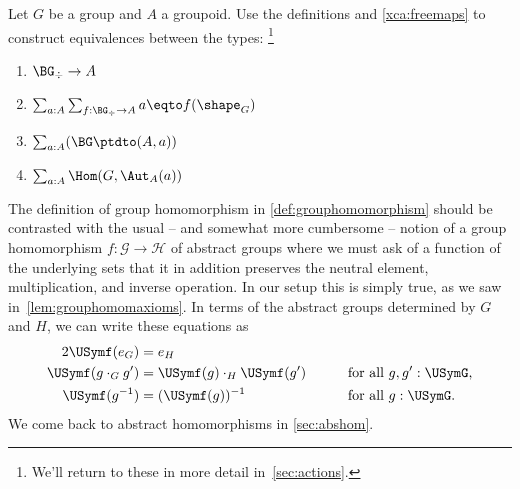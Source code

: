 

\begin{xca}\label{xca:BGtotype}
  Let $G$ be a group and $A$ a groupoid.  Use the definitions and
  \cref{xca:freemaps} to construct equivalences between the types:%
  \footnote{We'll return to these in more detail in~\cref{sec:actions}.}
  \begin{enumerate}
  \item $\BG_\div\to A$
  \item $\sum_{a:A}\sum_{f:\BG_\div \to A}a \eqto f(\shape_G)$
  \item $\sum_{a:A}(\BG\ptdto(A,a))$
  \item $\sum_{a:A}\Hom(G,\Aut_A(a))$\qedhere
  \end{enumerate}
\end{xca}

\begin{remark}\label{rem:first-abs-hom}
The definition of group homomorphism in \cref{def:grouphomomorphism} should be contrasted with the usual -- and somewhat more cumbersome -- notion of a group homomorphism
$f: \mathcal G\to \mathcal H$ of abstract groups where we must ask of a function of the underlying sets that it in addition preserves the neutral element,
multiplication, and inverse operation.
In our setup this is simply true, as we saw in~\cref{lem:grouphomomaxioms}.
In terms of the abstract groups determined by $G$ and $H$, we can write these equations
as
\begin{alignat*}2
  \USymf ( e_G )
  &= e_H
  &\qquad& \\
  \USymf (g \cdot_G g') &= \USymf(g) \cdot_H \USymf(g')
  && \text{for all $g, g' : \USymG$,} \\
  \USymf (g ^ {-1})
  &= (\USymf (g))^{-1}
  && \text{for all $g : \USymG$.}
\end{alignat*}
We come back to abstract homomorphisms in \cref{sec:abshom}.
\end{remark}

